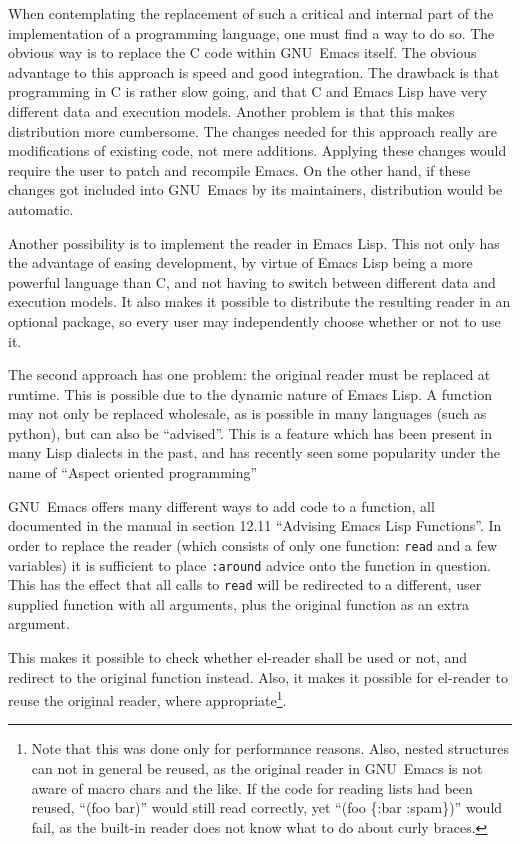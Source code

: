 \documentclass[a4paper,10pt,twoside]{report}
\newcommand{\el}{Emacs Lisp}
\newcommand{\elr}{el-reader}
\newcommand{\sym}[1]{\texttt{#1}}
\newcommand{\fun}[1]{\texttt{#1}}
\newcommand{\emacs}{GNU~Emacs}
\begin{document}
When contemplating the replacement of such a critical and internal part of the
implementation of a programming language, one must find a way to do so.  The
obvious way is to replace the C code within \emacs{} itself.  The obvious
advantage to this approach is speed and good integration.  The drawback is that
programming in C is rather slow going, and that C and \el{} have very different
data and execution models.  Another problem is that this makes distribution more
cumbersome.  The changes needed for this approach really are modifications of
existing code, not mere additions.  Applying these changes would require the
user to patch and recompile Emacs.  On the other hand, if these changes got
included into \emacs{} by its maintainers, distribution would be automatic.

Another possibility is to implement the reader in \el.  This not only has the
advantage of easing development, by virtue of \el{} being a more powerful
language than C, and not having to switch between different data and execution
models.  It also makes it possible to distribute the resulting reader in an
optional package, so every user may independently choose whether or not to use
it.

The second approach has one problem: the original reader must be replaced at
runtime.  This is possible due to the dynamic nature of \el.  A function may not
only be replaced wholesale, as is possible in many languages (such as python),
but can also be ``advised''.  This is a feature which has been present in many
Lisp dialects in the past, and has recently seen some popularity under the name
of ``Aspect oriented programming''

\emacs{} offers many different ways to add code to a function, all documented in
the manual in section 12.11 ``Advising Emacs Lisp
Functions''\cite{elisp-reference}.  In order to replace the reader (which
consists of only one function: \fun{read} and a few variables) it is sufficient
to place \sym{:around} advice onto the function in question.  This has the
effect that all calls to \fun{read} will be redirected to a different, user
supplied function with all arguments, plus the original function as an extra
argument.

This makes it possible to check whether \elr{} shall be used or not, and
redirect to the original function instead.  Also, it makes it possible for
\elr{} to reuse the original reader, where appropriate\footnote{Note that this
  was done only for performance reasons.  Also, nested structures can not in
  general be reused, as the original reader in \emacs{} is not aware of macro
  chars and the like.  If the code for reading lists had been reused, ``(foo
  bar)'' would still read correctly, yet ``(foo \{:bar :spam\})'' would fail, as
  the built-in reader does not know what to do about curly braces.}.
\end{document}
